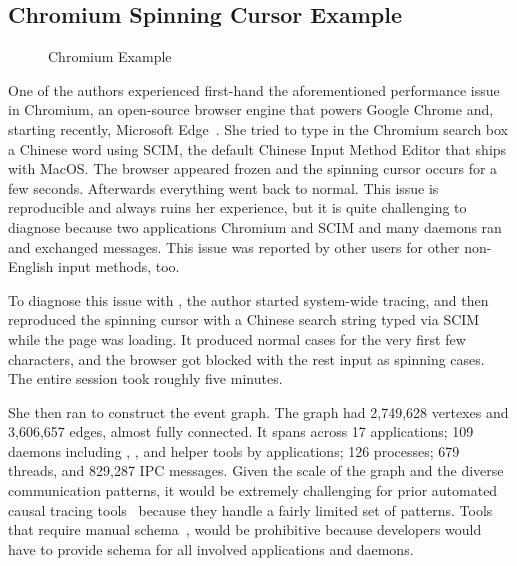 \subsection{Chromium Spinning Cursor Example}

\begin{figure}[h!]
    \centering
	
    \caption{Chromium Example}
    \label{fig:chromium-case-study}
\end{figure}

One of the authors experienced first-hand the aforementioned performance issue
in Chromium, an open-source browser engine that powers Google Chrome and,
starting recently, Microsoft Edge~\cite{chromiumurl}.  She tried to type in the
Chromium search box a Chinese word using SCIM, the default Chinese Input Method
Editor that ships with MacOS.  The browser appeared frozen and the spinning
cursor occurs for a few seconds.  Afterwards everything went back to normal.
This issue is reproducible and always ruins her experience, but it is quite
challenging to diagnose because two applications Chromium and SCIM and many
daemons ran and exchanged messages.  This issue was reported by other users for
other non-English input methods, too.

To diagnose this issue with \xxx, the author started system-wide tracing, and
then reproduced the spinning cursor with a Chinese search string typed via SCIM
while the page was loading. It produced normal cases for the very first few
characters, and the browser got blocked with the rest input as spinning cases.
The entire session took roughly five minutes.

She then ran \xxx to construct the event graph. The graph had 2,749,628 vertexes
and 3,606,657 edges, almost fully connected. It spans across 17 applications;
109 daemons including , ,  and
helper tools by applications; 126 processes; 679 threads, and 829,287
IPC messages. Given the scale of the graph and the diverse communication
patterns, it would be extremely challenging for prior automated causal tracing
tools~\cite{aguilera2003performance, zhang2013panappticon, attariyan2012x,
cohen2004correlating} because they handle a fairly limited set of patterns.
Tools that require manual schema~\cite{barham2004using, reynolds2006pip}, would
be prohibitive because developers would have to provide schema for all involved
applications and daemons.


